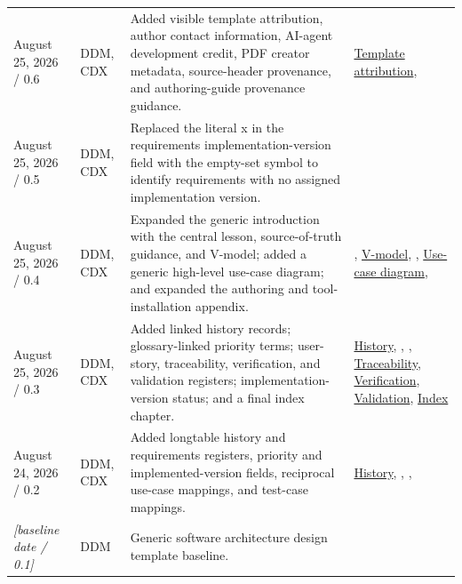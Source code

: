 \begin{tabularx}{\linewidth}{L{3.1cm}L{2.2cm}YL{2.0cm}}
August 25, 2026 / 0.6 & DDM, CDX & Added visible template attribution, author contact information, AI-agent development credit, PDF creator metadata, source-header provenance, and authoring-guide provenance guidance. & \hyperref[Chapter:TemplateAttribution]{Template attribution}, \\
August 25, 2026 / 0.5 & DDM, CDX & Replaced the literal x in the requirements implementation-version field with the empty-set symbol to identify requirements with no assigned implementation version. & \\
August 25, 2026 / 0.4 & DDM, CDX & Expanded the generic introduction with the central lesson, source-of-truth guidance, and V-model; added a generic high-level use-case diagram; and expanded the authoring and tool-installation appendix. & , \hyperref[Figure:VModel]{V-model}, , \hyperref[Figure:UseCaseDiagram]{Use-case diagram}, \\
August 25, 2026 / 0.3 & DDM, CDX & Added linked history records; glossary-linked priority terms; user-story, traceability, verification, and validation registers; implementation-version status; and a final index chapter. & \hyperref[Table:DocumentHistory]{History}, , , \hyperref[Table:TraceabilityMatrix]{Traceability}, \hyperref[Table:VerificationRegister]{Verification}, \hyperref[Table:ValidationRegister]{Validation}, \hyperref[Chapter:Index]{Index}\\
August 24, 2026 / 0.2 & DDM, CDX & Added longtable history and requirements registers, priority and implemented-version fields, reciprocal use-case mappings, and test-case mappings. & \hyperref[Table:DocumentHistory]{History}, , , \\
\textit{[baseline date / 0.1]} & DDM & Generic software architecture design template baseline. & \\
\end{tabularx}
